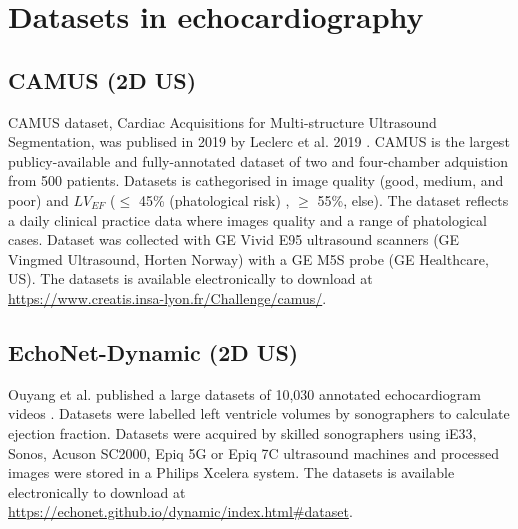 \section{Datasets in echocardiography}


\subsection{CAMUS (2D US)}
CAMUS dataset, Cardiac Acquisitions for Multi-structure Ultrasound Segmentation, was publised in 2019 by Leclerc et al. 2019 \cite{leclerc2019-IEEETransMedicalImaging}.
CAMUS is the largest publicy-available and fully-annotated dataset of two and four-chamber adquistion from 500 patients.
Datasets is cathegorised in image quality (good, medium, and poor) and $LV_{EF}$ ($\leq$ 45\% (phatological risk) , $\geq$ 55\%, else).
The dataset reflects a daily clinical practice data where images quality and a range of phatological cases.
Dataset was collected with GE Vivid E95 ultrasound scanners (GE Vingmed Ultrasound, Horten Norway) with a GE M5S probe (GE Healthcare, US).
The datasets is available electronically to download at \url{https://www.creatis.insa-lyon.fr/Challenge/camus/}.

\subsection{EchoNet-Dynamic (2D US)}
Ouyang et al. published a large datasets of 10,030 annotated echocardiogram videos \cite{ouyang-NeuripsML4H2019, Ouyang-Nature-APR2020}.
Datasets were labelled left ventricle volumes by sonographers to calculate ejection fraction.
Datasets were acquired by skilled sonographers using iE33, Sonos, Acuson SC2000, Epiq 5G or Epiq 7C ultrasound machines and processed images were stored in a Philips Xcelera system.
The datasets is available electronically to download at \url{https://echonet.github.io/dynamic/index.html#dataset}.

